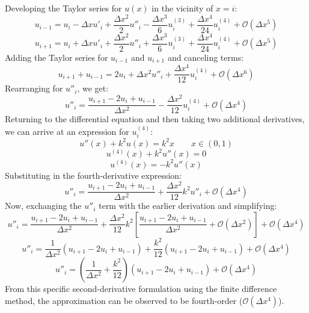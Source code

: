 \documentclass[10pt]{article}		%
\numberwithin{equation}{section}
\begin{document}
Developing the Taylor series for $u(x)$ in the vicinity of $x = i$:
\begin{equation}
u_{i-1} = u_i - \Delta x u'_i + \frac{\Delta x^2}{2} u''_i - \frac{\Delta x^3}{6} u^{(3)}_i + \frac{\Delta x^4}{24} u^{(4)}_i + \mathcal{O}(\Delta x^5)
\end{equation}
\begin{equation}
u_{i+1} = u_i + \Delta x u'_i + \frac{\Delta x^2}{2} u''_i + \frac{\Delta x^3}{6} u^{(3)}_i + \frac{\Delta x^4}{24} u^{(4)}_i + \mathcal{O}(\Delta x^5)
\end{equation}
Adding the Taylor series for $u_{i-1}$ and $u_{i+1}$ and canceling terms:
\begin{equation}
u_{i+1} + u_{i-1} = 2u_i + \Delta x^2 u''_i + \frac{\Delta x^4}{12} u^{(4)}_i + \mathcal{O}(\Delta x^6)
\end{equation}
Rearranging for $u''_i$, we get:
\begin{equation}
u''_i = \frac{u_{i+1} -2u_i + u_{i-1}}{\Delta x^2} - \frac{\Delta x^2}{12} u^{(4)}_i + \mathcal{O}(\Delta x^4)
\end{equation}
Returning to the differential equation and then taking two additional derivatives, we can arrive at an expression for $u^{(4)}_i$:
\begin{equation}
u''(x)+k^2u(x)=k^2x \qquad x \in (0, 1)
\end{equation}
\begin{equation}
u^{(4)}(x)+k^2u''(x)=0
\end{equation}
\begin{equation}
u^{(4)}(x) = - k^2u''(x)
\end{equation}
Substituting in the fourth-derivative expression:
\begin{equation}
u''_i = \frac{u_{i+1} -2u_i + u_{i-1}}{\Delta x^2} + \frac{\Delta x^2}{12} k^2u''_i + \mathcal{O}(\Delta x^4)
\end{equation}
Now, exchanging the $u''_i$ term with the earlier derivation and simplifying:
\begin{equation}
u''_i = \frac{u_{i+1} -2u_i + u_{i-1}}{\Delta x^2} + \frac{\Delta x^2}{12} k^2 \left[\frac{u_{i+1} -2u_i + u_{i-1}}{\Delta x^2} + \mathcal{O}(\Delta x^2) \right] + \mathcal{O}(\Delta x^4)
\end{equation}
\begin{equation}
u''_i = \frac{1}{\Delta x^2} (u_{i+1} -2u_i + u_{i-1}) + \frac{k^2}{12} (u_{i+1} -2u_i + u_{i-1}) + \mathcal{O}(\Delta x^4)
\end{equation}
\begin{equation}
u''_i = \left(\frac{1}{\Delta x^2} + \frac{k^2}{12}\right) (u_{i+1} -2u_i + u_{i-1}) + \mathcal{O}(\Delta x^4)
\end{equation}
From this specific second-derivative formulation using the finite difference method, the approximation can be observed to be fourth-order ($\mathcal{O}(\Delta x^4)$).
\end{document}
